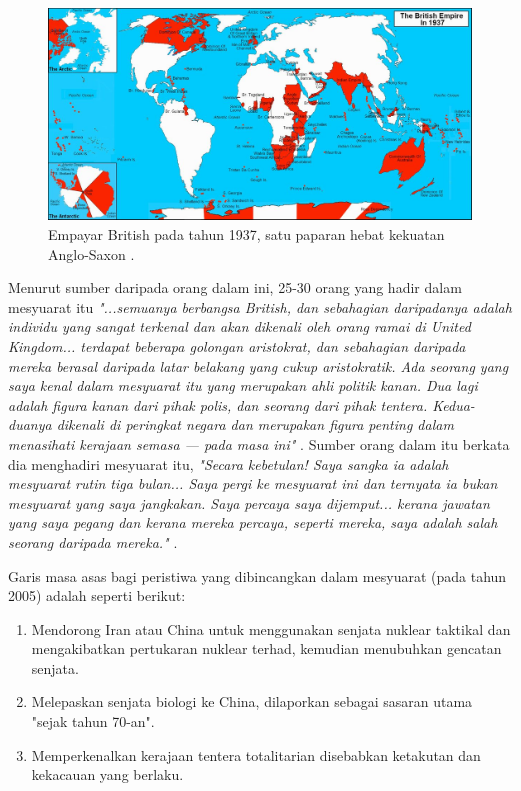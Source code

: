 \documentclass[10pt,twocolumn,letterpaper]{article}
\begin{document}
\begin{figure}[t]
\begin{center}
\includegraphics[width=1\textwidth]{british.jpg}
\end{center}
   \caption{Empayar British pada tahun 1937, satu paparan hebat kekuatan Anglo-Saxon \cite{14}.}
   \label{fig:2}
\end{figure}
Menurut sumber daripada orang dalam ini, 25-30 orang yang hadir dalam mesyuarat itu \textit{"...semuanya berbangsa British, dan sebahagian daripadanya adalah individu yang sangat terkenal dan akan dikenali oleh orang ramai di United Kingdom... terdapat beberapa golongan aristokrat, dan sebahagian daripada mereka berasal daripada latar belakang yang cukup aristokratik. Ada seorang yang saya kenal dalam mesyuarat itu yang merupakan ahli politik kanan. Dua lagi adalah figura kanan dari pihak polis, dan seorang dari pihak tentera. Kedua-duanya dikenali di peringkat negara dan merupakan figura penting dalam menasihati kerajaan semasa — pada masa ini"} \cite{4}. Sumber orang dalam itu berkata dia menghadiri mesyuarat itu, \textit{"Secara kebetulan! Saya sangka ia adalah mesyuarat rutin tiga bulan... Saya pergi ke mesyuarat ini dan ternyata ia bukan mesyuarat yang saya jangkakan. Saya percaya saya dijemput... kerana jawatan yang saya pegang dan kerana mereka percaya, seperti mereka, saya adalah salah seorang daripada mereka."} \cite{4}.

Garis masa asas bagi peristiwa yang dibincangkan dalam mesyuarat (pada tahun 2005) adalah seperti berikut:

\begin{flushleft}
\begin{enumerate}
    \item Mendorong Iran atau China untuk menggunakan senjata nuklear taktikal dan mengakibatkan pertukaran nuklear terhad, kemudian menubuhkan gencatan senjata.
    \item Melepaskan senjata biologi ke China, dilaporkan sebagai sasaran utama "sejak tahun 70-an".
    \item Memperkenalkan kerajaan tentera totalitarian disebabkan ketakutan dan kekacauan yang berlaku.
\end{enumerate}
\end{flushleft}
\end{document}
